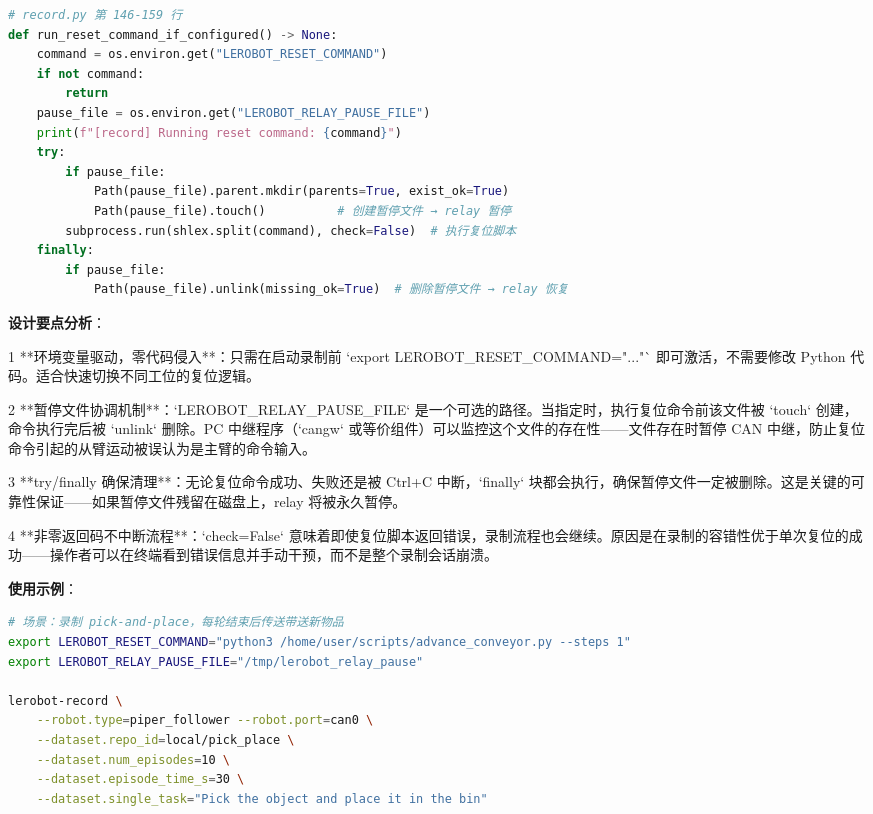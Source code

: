 \documentclass[UTF8,a4paper,11pt]{ctexart}
\begin{document}
{\begin{lstlisting}[language=python]
# record.py 第 146-159 行
def run_reset_command_if_configured() -> None:
    command = os.environ.get("LEROBOT_RESET_COMMAND")
    if not command:
        return
    pause_file = os.environ.get("LEROBOT_RELAY_PAUSE_FILE")
    print(f"[record] Running reset command: {command}")
    try:
        if pause_file:
            Path(pause_file).parent.mkdir(parents=True, exist_ok=True)
            Path(pause_file).touch()          # 创建暂停文件 → relay 暂停
        subprocess.run(shlex.split(command), check=False)  # 执行复位脚本
    finally:
        if pause_file:
            Path(pause_file).unlink(missing_ok=True)  # 删除暂停文件 → relay 恢复
\end{lstlisting}

\textbf{设计要点分析}：

\item[1] **环境变量驱动，零代码侵入**：只需在启动录制前 `export LEROBOT_RESET_COMMAND="..."` 即可激活，不需要修改 Python 代码。适合快速切换不同工位的复位逻辑。

\item[2] **暂停文件协调机制**：`LEROBOT_RELAY_PAUSE_FILE` 是一个可选的路径。当指定时，执行复位命令前该文件被 `touch` 创建，命令执行完后被 `unlink` 删除。PC 中继程序（`cangw` 或等价组件）可以监控这个文件的存在性——文件存在时暂停 CAN 中继，防止复位命令引起的从臂运动被误认为是主臂的命令输入。

\item[3] **try/finally 确保清理**：无论复位命令成功、失败还是被 Ctrl+C 中断，`finally` 块都会执行，确保暂停文件一定被删除。这是关键的可靠性保证——如果暂停文件残留在磁盘上，relay 将被永久暂停。

\item[4] **非零返回码不中断流程**：`check=False` 意味着即使复位脚本返回错误，录制流程也会继续。原因是在录制的容错性优于单次复位的成功——操作者可以在终端看到错误信息并手动干预，而不是整个录制会话崩溃。

\textbf{使用示例}：

\begin{lstlisting}[language=bash]
# 场景：录制 pick-and-place，每轮结束后传送带送新物品
export LEROBOT_RESET_COMMAND="python3 /home/user/scripts/advance_conveyor.py --steps 1"
export LEROBOT_RELAY_PAUSE_FILE="/tmp/lerobot_relay_pause"

lerobot-record \
    --robot.type=piper_follower --robot.port=can0 \
    --dataset.repo_id=local/pick_place \
    --dataset.num_episodes=10 \
    --dataset.episode_time_s=30 \
    --dataset.single_task="Pick the object and place it in the bin"
\end{lstlisting}

}
\end{document}

